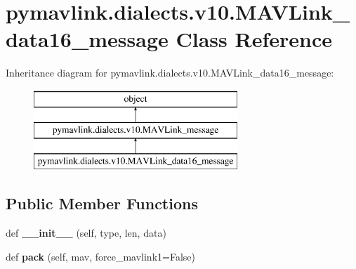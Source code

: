 \hypertarget{classpymavlink_1_1dialects_1_1v10_1_1MAVLink__data16__message}{}\section{pymavlink.\+dialects.\+v10.\+M\+A\+V\+Link\+\_\+data16\+\_\+message Class Reference}
\label{classpymavlink_1_1dialects_1_1v10_1_1MAVLink__data16__message}
Inheritance diagram for pymavlink.\+dialects.\+v10.\+M\+A\+V\+Link\+\_\+data16\+\_\+message\+:\begin{figure}[H]
\begin{center}
\leavevmode
\includegraphics[height=3.000000cm]{classpymavlink_1_1dialects_1_1v10_1_1MAVLink__data16__message}
\end{center}
\end{figure}
\subsection*{Public Member Functions}
\begin{DoxyCompactItemize}
\item 
\mbox{\label{classpymavlink_1_1dialects_1_1v10_1_1MAVLink__data16__message_acc609a909b60117244a0378e3b869104}} 
def {\bfseries \+\_\+\+\_\+init\+\_\+\+\_\+} (self, type, len, data)
\item 
\mbox{\label{classpymavlink_1_1dialects_1_1v10_1_1MAVLink__data16__message_a6877fa0ba725c97642ce5f56eadca61c}} 
def {\bfseries pack} (self, mav, force\+\_\+mavlink1=False)
\end{DoxyCompactItemize}
